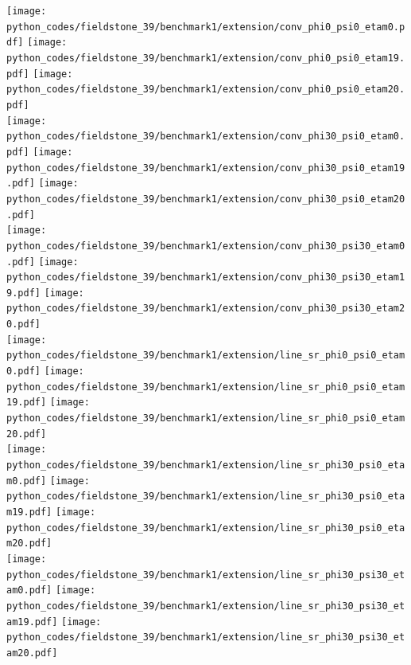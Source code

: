 \begin{center}
\texttt{[image: python\_codes/fieldstone\_39/benchmark1/extension/conv\_phi0\_psi0\_etam0.pdf]}
\texttt{[image: python\_codes/fieldstone\_39/benchmark1/extension/conv\_phi0\_psi0\_etam19.pdf]}
\texttt{[image: python\_codes/fieldstone\_39/benchmark1/extension/conv\_phi0\_psi0\_etam20.pdf]}\\
\texttt{[image: python\_codes/fieldstone\_39/benchmark1/extension/conv\_phi30\_psi0\_etam0.pdf]}
\texttt{[image: python\_codes/fieldstone\_39/benchmark1/extension/conv\_phi30\_psi0\_etam19.pdf]}
\texttt{[image: python\_codes/fieldstone\_39/benchmark1/extension/conv\_phi30\_psi0\_etam20.pdf]}\\
\texttt{[image: python\_codes/fieldstone\_39/benchmark1/extension/conv\_phi30\_psi30\_etam0.pdf]}
\texttt{[image: python\_codes/fieldstone\_39/benchmark1/extension/conv\_phi30\_psi30\_etam19.pdf]}
\texttt{[image: python\_codes/fieldstone\_39/benchmark1/extension/conv\_phi30\_psi30\_etam20.pdf]}\\
\texttt{[image: python\_codes/fieldstone\_39/benchmark1/extension/line\_sr\_phi0\_psi0\_etam0.pdf]}
\texttt{[image: python\_codes/fieldstone\_39/benchmark1/extension/line\_sr\_phi0\_psi0\_etam19.pdf]}
\texttt{[image: python\_codes/fieldstone\_39/benchmark1/extension/line\_sr\_phi0\_psi0\_etam20.pdf]}\\
\texttt{[image: python\_codes/fieldstone\_39/benchmark1/extension/line\_sr\_phi30\_psi0\_etam0.pdf]}
\texttt{[image: python\_codes/fieldstone\_39/benchmark1/extension/line\_sr\_phi30\_psi0\_etam19.pdf]}
\texttt{[image: python\_codes/fieldstone\_39/benchmark1/extension/line\_sr\_phi30\_psi0\_etam20.pdf]}\\
\texttt{[image: python\_codes/fieldstone\_39/benchmark1/extension/line\_sr\_phi30\_psi30\_etam0.pdf]}
\texttt{[image: python\_codes/fieldstone\_39/benchmark1/extension/line\_sr\_phi30\_psi30\_etam19.pdf]}
\texttt{[image: python\_codes/fieldstone\_39/benchmark1/extension/line\_sr\_phi30\_psi30\_etam20.pdf]}\\
\end{center}

